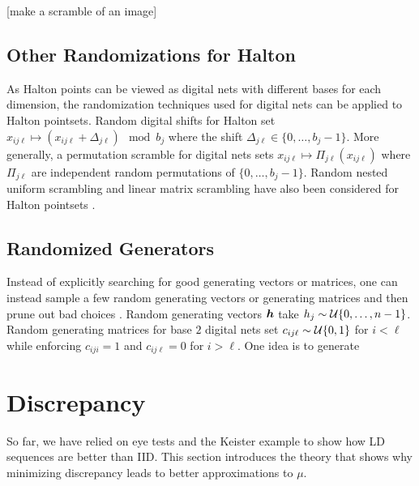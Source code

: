 \documentclass{svproc}
\begin{document}
[make a scramble of an image]

\subsection{Other Randomizations for Halton}

As Halton points can be viewed as digital nets with different bases for each dimension, the randomization techniques used for digital nets can be applied to Halton pointsets. Random digital shifts for Halton set $x_{ij\ell} \mapsto (x_{ij\ell} + \Delta_{j\ell}) \mod b_j$ where the shift $\Delta_{j\ell} \in \{0,\dots,b_j-1\}$. More generally, a permutation scramble for digital nets sets $x_{ij\ell} \mapsto \Pi_{j\ell}(x_{ij\ell})$ where $\Pi_{j\ell}$ are independent random permutations of $\{0,\dots,b_j-1\}$. Random nested uniform scrambling and linear matrix scrambling have also been considered for Halton pointsets \cite{owen2024gain}. 

\subsection{Randomized Generators}

Instead of explicitly searching for good generating vectors or matrices, one can instead sample a few random generating vectors or generating matrices and then prune out bad choices \cite{}.  Random generating vectors ${\boldsymbol{h}}$ take $h_j \sim {\mathcal{U}}\{0,\dots,n-1\}$. Random generating matrices for base $2$ digital nets set $c_{ij\ell} \sim {\mathcal{U}}\{0,1\}$ for $i<\ell$ while enforcing $c_{iji}=1$ and $c_{ij\ell}=0$ for $i>\ell$. One idea is to generate 

\section{Discrepancy} \label{sec:discrepancy}
So far, we have relied on eye tests and the Keister example to show how LD sequences are better than IID.  This section introduces the theory that shows why minimizing discrepancy leads to better approximations to $\mu$.
\end{document}
